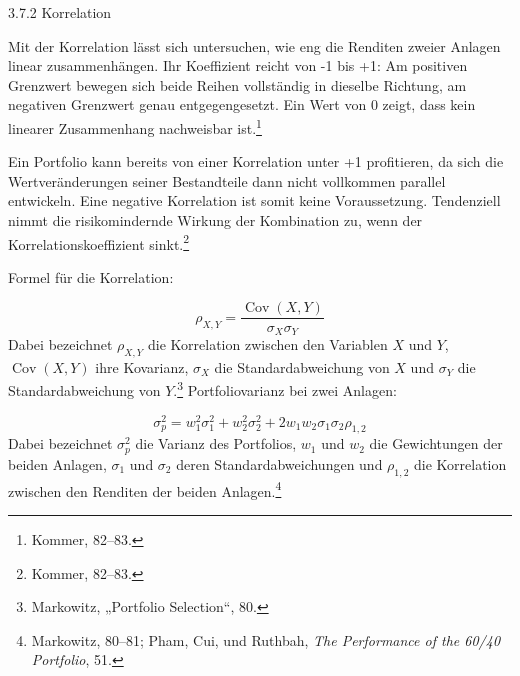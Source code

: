 \documentclass[
  ngerman,
  a4paper,
  DIV=11,
  oneside]{scrreprt}
\begin{document}
3.7.2 Korrelation

Mit der Korrelation lässt sich untersuchen, wie eng die Renditen zweier
Anlagen linear zusammenhängen. Ihr Koeffizient reicht von -1 bis +1: Am
positiven Grenzwert bewegen sich beide Reihen vollständig in dieselbe
Richtung, am negativen Grenzwert genau entgegengesetzt. Ein Wert von 0
zeigt, dass kein linearer Zusammenhang nachweisbar ist.\footnote{Kommer,
  82--83.}

Ein Portfolio kann bereits von einer Korrelation unter +1 profitieren,
da sich die Wertveränderungen seiner Bestandteile dann nicht vollkommen
parallel entwickeln. Eine negative Korrelation ist somit keine
Voraussetzung. Tendenziell nimmt die risikomindernde Wirkung der
Kombination zu, wenn der Korrelationskoeffizient sinkt.\footnote{Kommer,
  82--83.}

Formel für die Korrelation:

\[
\rho_{X,Y}=\frac{\operatorname{Cov}(X,Y)}{\sigma_X\sigma_Y}
\] Dabei bezeichnet \textbf{\(\rho_{X,Y}\)} die Korrelation zwischen den
Variablen \textbf{\(X\)} und \textbf{\(Y\)},
\textbf{\(\operatorname{Cov}(X,Y)\)} ihre Kovarianz,
\textbf{\(\sigma_X\)} die Standardabweichung von \textbf{\(X\)} und
\textbf{\(\sigma_Y\)} die Standardabweichung von
\textbf{\(Y\)}.\footnote{Markowitz, {„Portfolio {Selection}``}, 80.}
Portfoliovarianz bei zwei Anlagen:

\[
\sigma_p^2=w_1^2\sigma_1^2+w_2^2\sigma_2^2+2w_1w_2\sigma_1\sigma_2\rho_{1,2}
\] Dabei bezeichnet \textbf{\(\sigma_p^2\)} die Varianz des Portfolios,
\textbf{\(w_1\)} und \textbf{\(w_2\)} die Gewichtungen der beiden
Anlagen, \textbf{\(\sigma_1\)} und \textbf{\(\sigma_2\)} deren
Standardabweichungen und \textbf{\(\rho_{1,2}\)} die Korrelation
zwischen den Renditen der beiden Anlagen.\footnote{Markowitz, 80--81;
  Pham, Cui, und Ruthbah, \emph{The {Performance} of the 60/40
  {Portfolio}}, 51.}
\end{document}
